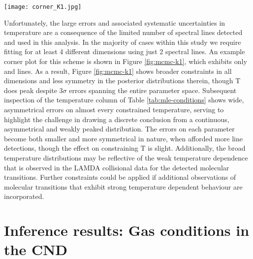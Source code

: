 \documentclass[twocolumn]{aastex631}
\begin{document}
\begin{figure*}
    \centering
    \texttt{[image: corner\_K1.jpg]}
    \caption{Corner plot for the K1 source as per Figure \ref{fig:mcmc-G2}. This shows much broader spread in all dimensions owing to the limited number of data points available. }
    \label{fig:mcmc-k1}
\end{figure*}

Unfortunately, the large errors and associated systematic uncertainties in temperature are a consequence of the limited number of spectral lines detected and used in this analysis. In the majority of cases within this study we require fitting for at least 4 different dimensions using just 2 spectral lines. An example corner plot for this scheme is shown in Figure \ref{fig:mcmc-k1}, which exhibits only  and  lines. As a result, Figure \ref{fig:mcmc-k1} shows broader constraints in all dimensions and less symmetry in the posterior distributions therein, though $\mathrm{T}$ does peak despite $3\sigma$ errors spanning the entire parameter space. Subsequent inspection of the temperature column of Table \ref{tab:mle-conditions} shows wide, asymmetrical errors on almost every constrained temperature, serving to highlight the challenge in drawing a discrete conclusion from a continuous, asymmetrical and weakly peaked distribution. The errors on each parameter become both smaller and more symmetrical in nature, when afforded more line detections, though the effect on constraining $\mathrm{T}$ is slight. Additionally, the broad temperature distributions may be reflective of the weak temperature dependence that is observed in the LAMDA collisional data for the detected molecular transitions. Further constraints could be applied if additional observations of molecular transitions that exhibit strong temperature dependent behaviour are incorporated.

\section{Inference results: Gas conditions in the CND} \label{sec:CND-gas-cond}
\end{document}
